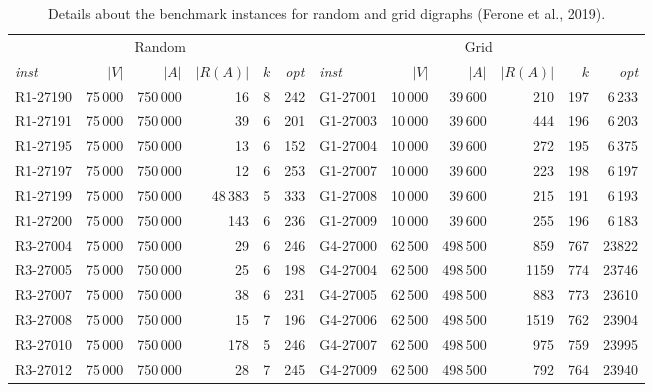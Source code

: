 \documentclass[pdflatex,sn-mathphys-num]{sn-jnl}
\begin{document}
\begin{table}[htbp]
\centering
\caption{Details about the benchmark instances for random and grid digraphs (Ferone et al., 2019).}
\label{tab:ferone-instances}
\begin{tabular}{lrrrrclrrrrr}
\toprule
\multicolumn{6}{c}{Random} & \multicolumn{6}{c}{Grid} \\
\cmidrule(r){1-6}\cmidrule(l){7-12}
\textit{inst} & $|V|$ & $|A|$ & $|R(A)|$ & $k$ & \textit{opt} &
\textit{inst} & $|V|$ & $|A|$ & $|R(A)|$ & $k$ & \textit{opt} \\
\midrule
R1-27190 & 75\,000 & 750\,000 & 16      & 8 & 242 &
   G1-27001 & 10\,000 & 39\,600 & 210    & 197 & 6\,233 \\
R1-27191 & 75\,000 & 750\,000 & 39      & 6 & 201 &
    G1-27003 & 10\,000 & 39\,600 & 444    & 196 & 6\,203 \\
R1-27195 & 75\,000 & 750\,000 & 13      & 6 & 152 &
  G1-27004 & 10\,000 & 39\,600 & 272    & 195 & 6\,375 \\
R1-27197 & 75\,000 & 750\,000 & 12      & 6 & 253 &
  G1-27007 & 10\,000 & 39\,600 & 223    & 198 & 6\,197 \\
R1-27199 & 75\,000 & 750\,000 & 48\,383 & 5 & 333 &
  G1-27008 & 10\,000 & 39\,600 & 215    & 191 & 6\,193 \\
R1-27200 & 75\,000 & 750\,000 & 143     & 6 & 236 &
  G1-27009 & 10\,000 & 39\,600 & 255    & 196 & 6\,183 \\

  
R3-27004 & 75\,000 & 750\,000 & 29      & 6 & 246 &
  G4-27000 & 62\,500 & 498\,500 & 859 & 767 & 23822 \\
R3-27005 & 75\,000 & 750\,000 & 25      & 6 & 198 &
  G4-27004 & 62\,500 & 498\,500 & 1159 & 774 & 23746 \\
R3-27007 & 75\,000 & 750\,000 & 38      & 6 & 231 &
  G4-27005 & 62\,500 & 498\,500 & 883 & 773 & 23610 \\
R3-27008 & 75\,000 & 750\,000 & 15      & 7 & 196 &
  G4-27006 & 62\,500 & 498\,500 & 1519 & 762 & 23904 \\
R3-27010 & 75\,000 & 750\,000 & 178     & 5 & 246 &
  G4-27007 & 62\,500 & 498\,500 & 975 & 759 & 23995 \\
R3-27012 & 75\,000 & 750\,000 & 28      & 7 & 245 &
  G4-27009 & 62\,500 & 498\,500 & 792 & 764 & 23940 \\
\bottomrule
\end{tabular}
\end{table}
\end{document}

